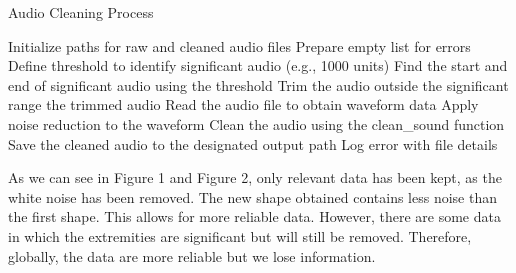 \documentclass[11pt]{article}
\begin{document}
\begin{algorithm}
\caption{Audio Cleaning Process}
\begin{algorithmic}[1]
\State Initialize paths for raw and cleaned audio files
\State Prepare empty list for errors
    \State Define threshold to identify significant audio (e.g., 1000 units)
    \State Find the start and end of significant audio using the threshold
    \State Trim the audio outside the significant range
    \State \Return the trimmed audio
\EndFunction
{}
        \State Read the audio file to obtain waveform data
        \State Apply noise reduction to the waveform
        \Try
            \State Clean the audio using the clean\_sound function
            \State Save the cleaned audio to the designated output path
        \Except
            \State Log error with file details
        \EndTry
\end{algorithmic}
\end{algorithm}
As we can see in Figure 1 and Figure 2, only relevant data has been kept, as the white noise has been removed. The new shape obtained contains less noise than the first shape. This allows for more reliable data. However, there are some data in which the extremities are significant but will still be removed. Therefore, globally, the data are more reliable but we lose information.\\
\end{document}
